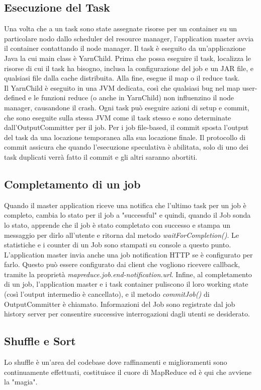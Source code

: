 \subsection{Esecuzione del Task}
Una volta che a un task sono state assegnate risorse per un container su un particolare nodo dallo scheduler del resource manager, l'application master avvia il container contattando il node manager. Il task è eseguito da un'applicazione Java la cui main class è YarnChild. Prima che possa eseguire il task, localizza le risorse di cui il task ha bisogno, inclusa la configurazione del job e un JAR file, e qualsiasi file dalla cache distribuita. Alla fine, esegue il map o il reduce task. \\
Il YarnChild è eseguito in una JVM dedicata, così che qualsiasi bug nel map user-defined e le funzioni reduce (o anche in YarnChild) non influenzino il node manager, causandone il crash.\newline
Ogni task può eseguire azioni di setup e commit, che sono eseguite sulla stessa JVM come il task stesso e sono determinate dall'OutputCommitter per il job. Per i job file-based, il commit sposta l'output del task da una locazione temporanea alla sua locazione finale. Il protocollo di commit assicura che quando l'esecuzione speculativa è abilitata, solo di uno dei task duplicati verrà fatto il commit e gli altri saranno abortiti.
\subsection{Completamento di un job}
Quando il master application riceve una notifica che l'ultimo task per un job è completo, cambia lo stato per il job a "successful" e quindi, quando il Job sonda lo stato, apprende che il job è stato completato con successo e stampa un messaggio per dirlo all'utente e ritorna dal metodo \textit{waitForCompletion()}. Le statistiche e i counter di un Job sono stampati su console a questo punto. L'application master invia anche una job notification HTTP se è configurato per farlo. Questo può essere configurato dai client che vogliono ricevere callback, tramite la proprietà \textit{mapreduce.job.end-notification.url}. Infine, al completamento di un job, l'application master e i task container puliscono il loro working state (così l'output intermedio è cancellato), e il metodo \textit{commitJob()} di OutputCommitter è chiamato. Informazioni del Job sono registrate dal job history server per consentire successive interrogazioni dagli utenti se desiderato.
\subsection{Shuffle e Sort}
Lo shuffle è un'area del codebase dove raffinamenti e miglioramenti sono continuamente effettuati, costituisce il cuore di MapReduce ed è qui che avviene la "magia".
